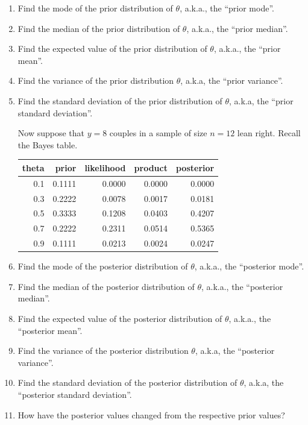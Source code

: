 \documentclass[
]{book}
\theoremstyle{definition}
\theoremstyle{definition}
\theoremstyle{definition}
\theoremstyle{remark}
\begin{document}
\begin{enumerate}
\def\labelenumi{\arabic{enumi}.}
\item
  Find the mode of the prior distribution of \(\theta\), a.k.a., the ``prior mode''.
\item
  Find the median of the prior distribution of \(\theta\), a.k.a., the ``prior median''.
\item
  Find the expected value of the prior distribution of \(\theta\), a.k.a., the ``prior mean''.
\item
  Find the variance of the prior distribution \(\theta\), a.k.a, the ``prior variance''.
\item
  Find the standard deviation of the prior distribution of \(\theta\), a.k.a, the ``prior standard deviation''.

  Now suppose that \(y=8\) couples in a sample of size \(n=12\) lean right. Recall the Bayes table.

  \begin{tabular}{r|r|r|r|r}
   \hline
   theta & prior & likelihood & product & posterior\\
   \hline
   0.1 & 0.1111 & 0.0000 & 0.0000 & 0.0000\\
   \hline
   0.3 & 0.2222 & 0.0078 & 0.0017 & 0.0181\\
   \hline
   0.5 & 0.3333 & 0.1208 & 0.0403 & 0.4207\\
   \hline
   0.7 & 0.2222 & 0.2311 & 0.0514 & 0.5365\\
   \hline
   0.9 & 0.1111 & 0.0213 & 0.0024 & 0.0247\\
   \hline
   \end{tabular}
\item
  Find the mode of the posterior distribution of \(\theta\), a.k.a., the ``posterior mode''.
\item
  Find the median of the posterior distribution of \(\theta\), a.k.a., the ``posterior median''.
\item
  Find the expected value of the posterior distribution of \(\theta\), a.k.a., the ``posterior mean''.
\item
  Find the variance of the posterior distribution \(\theta\), a.k.a, the ``posterior variance''.
\item
  Find the standard deviation of the posterior distribution of \(\theta\), a.k.a, the ``posterior standard deviation''.
\item
  How have the posterior values changed from the respective prior values?
\end{enumerate}
\end{document}

